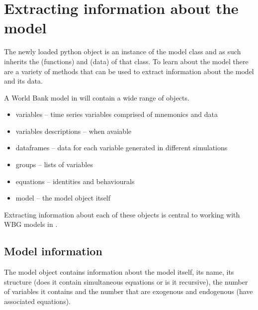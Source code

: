 \documentclass[letterpaper,10pt,english]{jupyterBook}
\begin{document}
\chapter{Extracting information about the model}
\label{\detokenize{content/05_WBModels/LoadingWBModel:extracting-information-about-the-model}}
\sphinxAtStartPar
The newly loaded python object   is an instance of the model class and as such inherits the  (functions) and  (data) of that class. To learn about the model there are a variety of methods that can be used to extract information about the model and its data.

\sphinxAtStartPar
A World Bank model in  will contain a wide range of objects.
\begin{itemize}
\item {} 
\sphinxAtStartPar
variables  – time series variables comprised of mnemonics and data

\item {} 
\sphinxAtStartPar
variables descriptions – when avaiable

\item {} 
\sphinxAtStartPar
dataframes – data for each variable generated in  different simulations

\item {} 
\sphinxAtStartPar
groups     – lists of variables

\item {} 
\sphinxAtStartPar
equations  – identities and behaviourals

\item {} 
\sphinxAtStartPar
model      – the model object itself

\end{itemize}

\sphinxAtStartPar
Extracting information about each of these objects is central to working with WBG models in .


\section{Model information}
\label{\detokenize{content/05_WBModels/LoadingWBModel:model-information}}
\sphinxAtStartPar
The model object contains information about the model itself, its name, its structure (does it contain simultaneous equations or is it recursive), the number of variables it contains and the number that are exogenous and endogenous (have associated equations).
\end{document}
